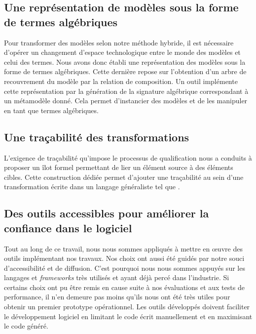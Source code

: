 
\subsection*{Une représentation de modèles sous la forme de termes algébriques}

Pour transformer des modèles selon notre méthode hybride, il est nécessaire
d'opérer un changement d'espace technologique entre le monde des modèles et
celui des termes. Nous avons donc établi une représentation des modèles sous la
forme de termes algébriques. Cette dernière repose sur l'obtention d'un arbre
de recouvrement du modèle par la relation de composition. Un outil implémente
cette représentation par la génération de la signature algébrique correspondant
à un métamodèle donné. Cela permet d'instancier des modèles et de les manipuler
en tant que termes algébriques.


\subsection*{Une traçabilité des transformations}

L'exigence de traçabilité qu'impose le processus de qualification nous a
conduits à proposer un îlot formel permettant de lier un élément source à
des éléments cibles. Cette construction dédiée permet d'ajouter une traçabilité
au sein d'une transformation écrite dans un langage généraliste tel que
{\java}.


\subsection*{Des outils accessibles pour améliorer la confiance dans le logiciel}

Tout au long de ce travail, nous nous sommes appliqués à mettre en œuvre des
outils implémentant nos travaux. Nos choix ont aussi été guidés par notre souci
d'accessibilité et de diffusion. C'est pourquoi nous nous sommes appuyés sur
les langages et \emph{frameworks} très utilisés et ayant déjà percé dans
l'industrie. Si certains choix ont pu être remis en cause suite à nos
évaluations et aux tests de performance, il n'en demeure pas moins qu'ils nous
ont été très utiles pour obtenir un premier prototype opérationnel. Les outils
développés doivent faciliter le développement logiciel en limitant le code
écrit manuellement et en maximisant le code généré. 

